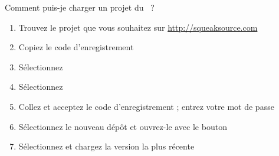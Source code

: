 \documentclass[a4paper,10pt,twoside]{book}
\begin{document}
\begin{faq}
Comment puis-je charger un projet du ~?
\end{faq}
\answer
\begin{enumerate}
  \item Trouvez le projet que vous souhaitez sur \url{http://squeaksource.com}
  \item Copiez le code d'enregistrement
  \item Sélectionnez 
  \item Sélectionnez 
  \item Collez et acceptez le code d'enregistrement ; entrez votre mot de passe
  \item Sélectionnez le nouveau dépôt et ouvrez-le avec le bouton 
  \item Sélectionnez et chargez la version la plus récente
\end{enumerate}
\end{document}
